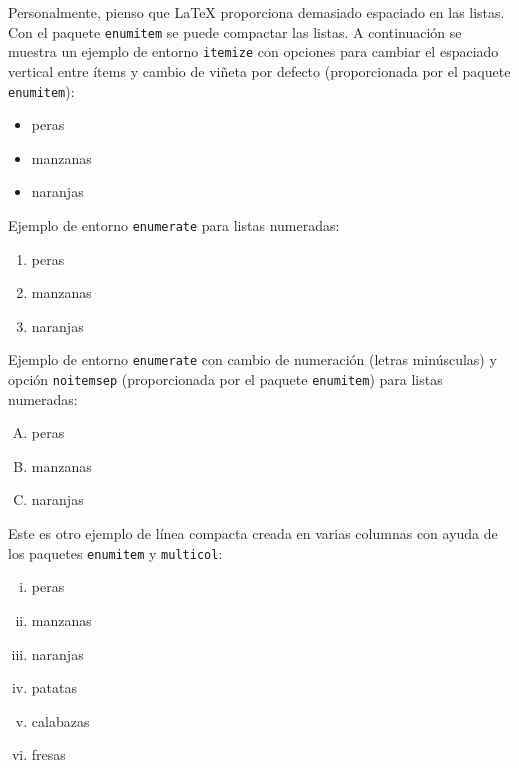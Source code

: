 Personalmente, pienso que \LaTeX{} proporciona demasiado espaciado en las listas. Con el paquete \texttt{enumitem} se puede compactar las listas. A continuación se muestra un ejemplo de entorno {\tt itemize} con opciones para cambiar el espaciado vertical entre ítems y cambio de viñeta por defecto (proporcionada por el paquete \texttt{enumitem}):

\begin{itemize}[\textbullet,noitemsep]
	\item peras
	\item manzanas
	\item naranjas
\end{itemize}

\noindent Ejemplo de entorno {\tt enumerate} para listas numeradas:

\begin{enumerate}
	\item peras
	\item manzanas
	\item naranjas
\end{enumerate}


\noindent Ejemplo de entorno {\tt enumerate} con cambio de numeración (letras minúsculas) y opción \texttt{noitemsep} (proporcionada por el paquete \texttt{enumitem}) para listas numeradas:

\begin{enumerate}[A.-,noitemsep]
	\item peras
	\item manzanas
	\item naranjas
\end{enumerate}

\noindent Este es otro ejemplo de línea compacta creada en varias columnas con ayuda de los paquetes \texttt{enumitem} y \texttt{multicol}:
\begin{multicols}{2} %
	\begin{enumerate}[i.,noitemsep]
		\item peras
		\item manzanas
		\item naranjas
		\item patatas
		\item calabazas
		\item fresas
	\end{enumerate}
\end{multicols}


